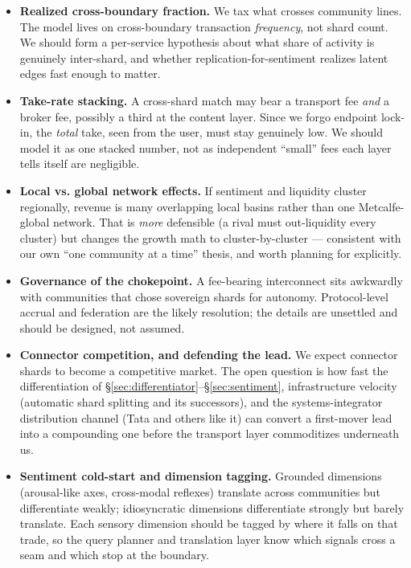 \documentclass[11pt]{article}
\begin{document}
\begin{itemize}[leftmargin=1.4em, itemsep=6pt]
  \item \textbf{Realized cross-boundary fraction.} We tax what crosses community lines. The model lives on cross-boundary transaction \emph{frequency}, not shard count. We should form a per-service hypothesis about what share of activity is genuinely inter-shard, and whether replication-for-sentiment realizes latent edges fast enough to matter.
  \item \textbf{Take-rate stacking.} A cross-shard match may bear a transport fee \emph{and} a broker fee, possibly a third at the content layer. Since we forgo endpoint lock-in, the \emph{total} take, seen from the user, must stay genuinely low. We should model it as one stacked number, not as independent ``small'' fees each layer tells itself are negligible.
  \item \textbf{Local vs. global network effects.} If sentiment and liquidity cluster regionally, revenue is many overlapping local basins rather than one Metcalfe-global network. That is \emph{more} defensible (a rival must out-liquidity every cluster) but changes the growth math to cluster-by-cluster --- consistent with our own ``one community at a time'' thesis, and worth planning for explicitly.
  \item \textbf{Governance of the chokepoint.} A fee-bearing interconnect sits awkwardly with communities that chose sovereign shards for autonomy. Protocol-level accrual and federation are the likely resolution; the details are unsettled and should be designed, not assumed.
  \item \textbf{Connector competition, and defending the lead.} We expect connector shards to become a competitive market. The open question is how fast the differentiation of \S\ref{sec:differentiator}--\S\ref{sec:sentiment}, infrastructure velocity (automatic shard splitting and its successors), and the systems-integrator distribution channel (Tata and others like it) can convert a first-mover lead into a compounding one before the transport layer commoditizes underneath us.
  \item \textbf{Sentiment cold-start and dimension tagging.} Grounded dimensions (arousal-like axes, cross-modal reflexes) translate across communities but differentiate weakly; idiosyncratic dimensions differentiate strongly but barely translate. Each sensory dimension should be tagged by where it falls on that trade, so the query planner and translation layer know which signals cross a seam and which stop at the boundary.
\end{itemize}
\end{document}
